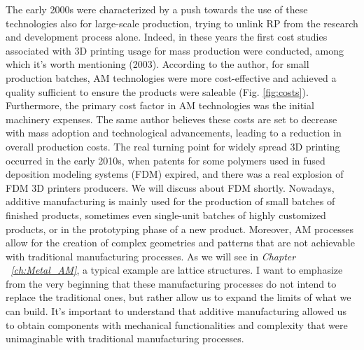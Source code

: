 The early 2000s were characterized by a push towards the use of these technologies also for large-scale production, trying to unlink RP from the research and development process alone. Indeed, in these years the first cost studies associated with 3D printing usage for mass production were conducted, among which it's worth mentioning \citeauthor{hopkinson_analysis_2003} (2003). According to the author, for small production batches, AM technologies were more cost-effective and achieved a quality sufficient to ensure the products were saleable (Fig. \ref{fig:costs}). Furthermore, the primary cost factor in AM technologies was the initial machinery expenses. The same author believes these costs are set to decrease with mass adoption and technological advancements, leading to a reduction in overall production costs. The real turning point for widely spread 3D printing occurred in the early 2010s, when patents for some polymers used in fused deposition modeling systems (FDM) expired, and there was a real explosion of FDM 3D printers producers. We will discuss about FDM shortly. Nowadays, additive manufacturing is mainly used for the production of small batches of finished products, sometimes even single-unit batches of highly customized products, or in the prototyping phase of a new product. Moreover, AM processes allow for the creation of complex geometries and patterns that are not achievable with traditional manufacturing processes. As we will see in \emph{Chapter ~\ref{ch:Metal_AM}}, a typical example are lattice structures. 
I want to emphasize from the very beginning that these manufacturing processes do not intend to replace the traditional ones, but rather allow us to expand the limits of what we can build. It's important to understand that additive manufacturing allowed us to obtain components with mechanical functionalities and complexity that were unimaginable with traditional manufacturing processes.


